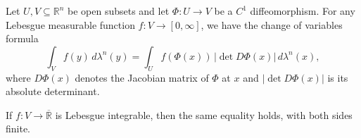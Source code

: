\begin{theorem} \label{theorem:change_of_variables_for_lebesgue_integrals_on_Rn}
Let $U, V \subseteq \mathbb{R}^n$ be open subsets and let $\Phi : U \to V$ be a $C^1$ diffeomorphism. For any Lebesgue measurable function $f : V \to [0,\infty]$, we have the change of variables formula
$$\int_V f(y)\,d\lambda^n(y) = \int_U f(\Phi(x))\,|\det D\Phi(x)|\,d\lambda^n(x),$$
where $D\Phi(x)$ denotes the Jacobian matrix of $\Phi$ at $x$ and $|\det D\Phi(x)|$ is its absolute determinant.

If $f : V \to \overline{\mathbb{R}}$ is Lebesgue integrable, then the same equality holds, with both sides finite.
\end{theorem}


